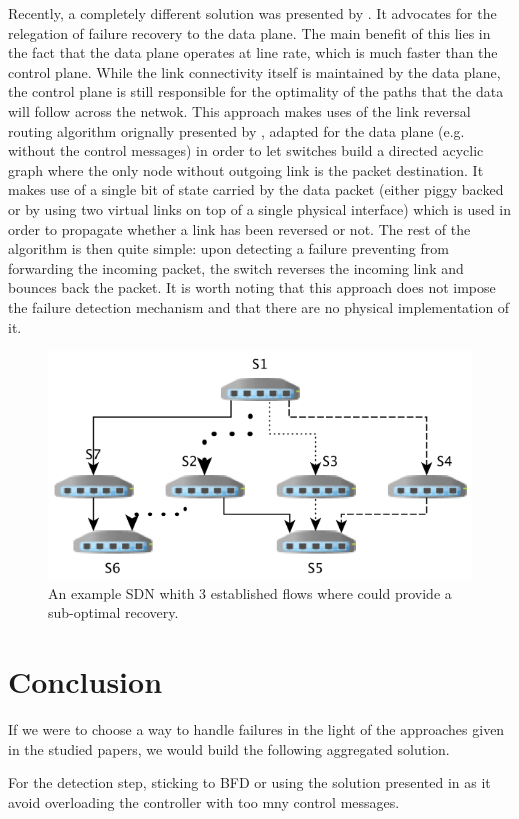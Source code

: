 \documentclass[final]{IEEEtran}
\begin{document}
Recently, a completely different solution was presented by \cite{Liu:2013:ECV:2482626.2482639}. It advocates for the relegation of failure recovery to the data plane. The main benefit of this lies in the fact that the data plane operates at line rate, which is much faster than the control plane. While the link connectivity itself is maintained by the data plane, the control plane is still responsible for the optimality of the paths that the data will follow across the netwok. This approach makes uses of the link reversal routing algorithm orignally presented by \cite{1094876}, adapted for the data plane (e.g. without the control messages) in order to let switches build a directed acyclic graph where the only node without outgoing link is the packet destination. It makes use of a single bit of state carried by the data packet (either piggy backed or by using two virtual links on top of a single physical interface) which is used in order to propagate whether a link has been reversed or not. The rest of the algorithm is then quite simple: upon detecting a failure preventing from forwarding the incoming packet, the switch reverses the incoming link and bounces back the packet. It is worth noting that this approach does not impose the failure detection mechanism and that there are no physical implementation of it.

\begin{figure}
	\includegraphics[width=.5\textwidth]{images/enabling_failures.png}
	\caption{An example SDN whith 3 established flows where \cite{2911632} could provide a sub-optimal recovery.}
	\label{fig:failures}
\end{figure}

\section{Conclusion}
If we were to choose a way to handle failures in the light of the approaches given in the studied papers, we would build the following aggregated solution.

For the detection step, sticking to BFD or using the solution presented in \cite{6364688} as it avoid overloading the controller with too mny control messages.
\end{document}
